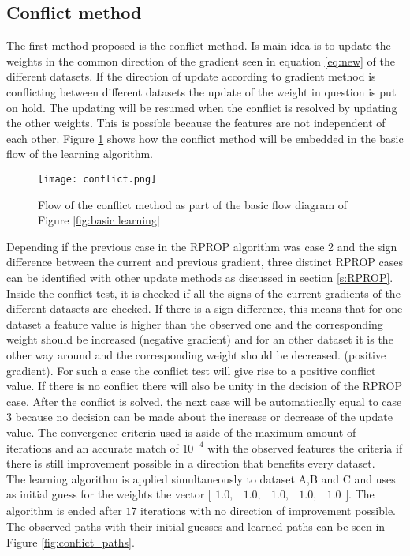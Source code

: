  \subsection{Conflict method}
 The first method proposed is the conflict method. Is main idea is to update the weights in the common direction of the gradient seen in equation \ref{eq:new} of the different datasets. If the direction of update according to gradient method is conflicting between different datasets the update of the weight in question is put on hold. The updating will be resumed when the conflict is resolved by updating the other weights. This is possible because the features are not independent of each other. Figure \ref{fig:conflict} shows how the conflict method will be embedded in the basic flow of the learning algorithm.\\
 
  \begin{figure}[h!]
 	\centering
 	\texttt{[image: conflict.png]}
 	\caption{Flow of the conflict method as part of the basic flow diagram of Figure \ref{fig:basic learning}}
 	\label{fig:conflict}
 \end{figure}

Depending if the previous case in the RPROP algorithm was case 2 and the sign difference between the current and previous gradient, three distinct RPROP cases can be identified with other update methods as discussed in section \ref{s:RPROP}. Inside the conflict test, it is checked if all the signs of the current gradients of the different datasets are checked. If there is a sign difference, this means that for one dataset a feature value is higher than the observed one and the corresponding weight should be increased (negative gradient) and for an other dataset it is the other way around and the corresponding weight should be decreased. (positive gradient). For such a case the conflict test will give rise to a positive conflict value. If there is no conflict there will also be unity in the decision of the RPROP case. After the conflict is solved, the next case will be automatically equal to case 3 because no decision can be made about the increase or decrease of the update value. The convergence criteria used is aside of the maximum amount of iterations and an accurate match of $10^{-4}$ with the observed features the criteria if there is still improvement possible in a direction that benefits every dataset.\\

The learning algorithm is applied simultaneously to dataset A,B and C and uses as initial guess for the weights the vector $\bigl[ \begin{smallmatrix} 1.0,&1.0,&1.0,&1.0,&1.0\end{smallmatrix}\bigr]$. The algorithm is ended after $17$ iterations with no direction of improvement possible. The observed paths with their initial guesses and learned paths can be seen in Figure \ref{fig:conflict_paths}.

